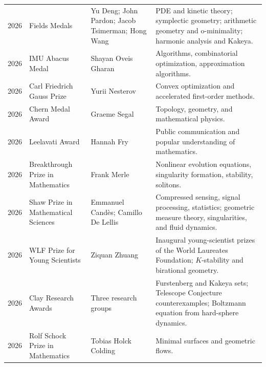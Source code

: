 {\begin{longtable}{@{}L{0.08\textwidth}L{0.25\textwidth}L{0.27\textwidth}L{0.32\textwidth}@{}}
        2026
        & Fields Medals
        & Yu Deng; John Pardon; Jacob Tsimerman; Hong Wang
        & PDE and kinetic theory; symplectic geometry; arithmetic geometry and
          o-minimality; harmonic analysis and Kakeya. \\

        2026
        & IMU Abacus Medal
        & Shayan Oveis Gharan
        & Algorithms, combinatorial optimization, approximation algorithms. \\

        2026
        & Carl Friedrich Gauss Prize
        & Yurii Nesterov
        & Convex optimization and accelerated first-order methods. \\

        2026
        & Chern Medal Award
        & Graeme Segal
        & Topology, geometry, and mathematical physics. \\

        2026
        & Leelavati Award
        & Hannah Fry
        & Public communication and popular understanding of mathematics. \\

        2026
        & Breakthrough Prize in Mathematics
        & Frank Merle
        & Nonlinear evolution equations, singularity formation, stability, solitons. \\

        2026
        & Shaw Prize in Mathematical Sciences
        & Emmanuel Cand\`es; Camillo De Lellis
        & Compressed sensing, signal processing, statistics; geometric measure
          theory, singularities, and fluid dynamics. \\

        2026
        & WLF Prize for Young Scientists
        & Ziquan Zhuang
        & Inaugural young-scientist prizes of the World Laureates Foundation;
          $K$-stability and birational geometry. \\

        2026
        & Clay Research Awards
        & Three research groups
        & Furstenberg and Kakeya sets; Telescope Conjecture counterexamples;
          Boltzmann equation from hard-sphere dynamics. \\

        2026
        & Rolf Schock Prize in Mathematics
        & Tobias Holck Colding
        & Minimal surfaces and geometric flows. \\


\end{longtable}}
